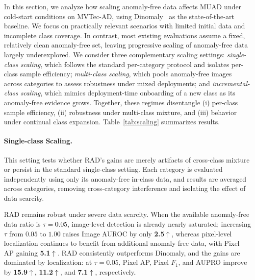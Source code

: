 \documentclass{article}
\theoremstyle{plain}
\theoremstyle{definition}
\theoremstyle{remark}
\begin{document}
In this section, we analyze how scaling anomaly-free data affects MUAD under cold-start conditions on MVTec-AD, using Dinomaly~\cite{guo2025dinomaly} as the state-of-the-art baseline. We focus on practically relevant scenarios with limited initial data and incomplete class coverage. In contrast, most existing evaluations assume a fixed, relatively clean anomaly-free set, leaving progressive scaling of anomaly-free data largely underexplored. We consider three complementary scaling settings: \emph{single-class scaling}, which follows the standard per-category protocol and isolates per-class sample efficiency; \emph{multi-class scaling}, which pools anomaly-free images across categories to assess robustness under mixed deployments; and \emph{incremental-class scaling}, which mimics deployment-time onboarding of a new class as its anomaly-free evidence grows. Together, these regimes disentangle (i) per-class sample efficiency, (ii) robustness under multi-class mixture, and (iii) behavior under continual class expansion.  Table~\ref{tab:scaling} summarizes results.




\paragraph{Single-class Scaling.}
This setting tests whether RAD’s gains are merely artifacts of cross-class mixture or persist in the standard single-class setting. Each category is evaluated independently using only its anomaly-free in-class data, and results are averaged across categories, removing cross-category interference and isolating the effect of data scarcity.


RAD remains robust under severe data scarcity. When the available anomaly-free data ratio is $\tau{=}0.05$, image-level detection is already nearly saturated; increasing $\tau$ from $0.05$ to $1.00$ raises Image AUROC by only \textbf{2.5$\uparrow$}, whereas pixel-level localization continues to benefit from additional anomaly-free data, with Pixel AP gaining \textbf{5.1$\uparrow$}. RAD consistently outperforms Dinomaly, and the gains are dominated by localization: at $\tau{=}0.05$, Pixel AP, Pixel $F_1$, and AUPRO improve by \textbf{15.9$\uparrow$}, \textbf{11.2$\uparrow$}, and \textbf{7.1$\uparrow$}, respectively.
\end{document}
